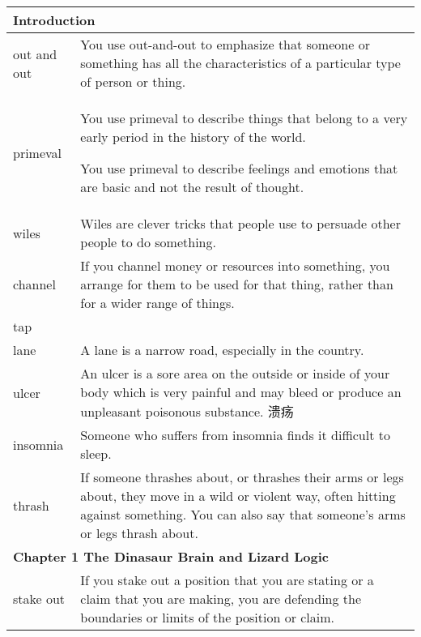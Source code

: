 \documentclass{article}
\begin{document}
\begin{center}
\begin{longtable}{|l|p{9cm}|}

\hline
\multicolumn{2}{|l|}{\textbf{Introduction}}\\

\hline
out and out
&
You use out-and-out to emphasize that someone or something has all the characteristics of a particular type of person or thing.
\\

\hline
primeval
&
You use primeval to describe things that belong to a very early period in the history of the world.
\par
You use primeval to describe feelings and emotions that are basic and not the result of thought.
\\

\hline
wiles
&
Wiles are clever tricks that people use to persuade other people to do something.
\\

\hline
channel
&
If you channel money or resources into something, you arrange for them to be used for that thing, rather than for a wider range of things.
\\

\hline
tap
&

\\

\hline
lane
&
A lane is a narrow road, especially in the country.
\\

\hline
ulcer
&
An ulcer is a sore area on the outside or inside of your body which is very painful and may bleed or produce an unpleasant poisonous substance. 溃疡
\\

\hline
insomnia
&
Someone who suffers from insomnia finds it difficult to sleep.
\\

\hline
thrash
&
If someone thrashes about, or thrashes their arms or legs about, they move in a wild or violent way, often hitting against something. You can also say that someone's arms or legs thrash about.
\\

\hline
\multicolumn{2}{|l|}{\textbf{Chapter 1 The Dinasaur Brain and Lizard Logic}}\\

\hline
stake out
&
If you stake out a position that you are stating or a claim that you are making, you are defending the boundaries or limits of the position or claim.
\\


\end{longtable}
\end{center}
\end{document}
